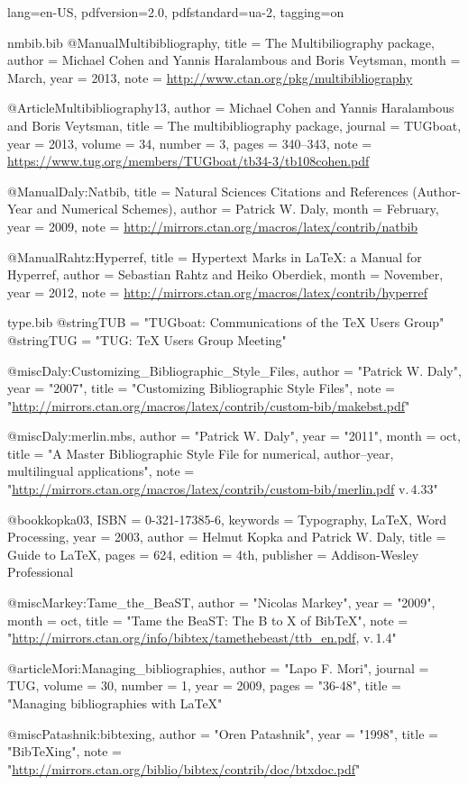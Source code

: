 \DocumentMetadata
  {
    lang=en-US,
    pdfversion=2.0,
    pdfstandard=ua-2,
    tagging=on
  }
\begin{filecontents}[noheader]{nmbib.bib}
@Manual{Multibibliography,
  title = 	 {The {M}ultibiliography package},
  author =	 {Michael Cohen and Yannis Haralambous and Boris Veytsman},
  month =	 {March},
  year =	 2013,
  note =	 {\url{http://www.ctan.org/pkg/multibibliography}}
}

@Article{Multibibliography13,
  author = 	 {Michael Cohen and Yannis Haralambous and Boris Veytsman},
  title = 	 {The multibibliography package},
  journal = 	 {TUGboat},
  year = 	 2013,
  volume =	 34,
  number =	 3,
  pages =	 {340--343},
  note =	 {\url{https://www.tug.org/members/TUGboat/tb34-3/tb108cohen.pdf}}
}

@Manual{Daly:Natbib,
  title = 	 {Natural Sciences Citations and References
                  (Author-Year and Numerical Schemes)},
  author =	 {Patrick W. Daly},
  month =	 {February},
  year =	 2009,
  note =	 {\url{http://mirrors.ctan.org/macros/latex/contrib/natbib}}
}

@Manual{Rahtz:Hyperref,
  title = 	 {Hypertext Marks in \LaTeX: a Manual for Hyperref},
  author =	 {Sebastian Rahtz and Heiko Oberdiek},
  month =	 {November},
  year =	 2012,
  note =	 {\url{http://mirrors.ctan.org/macros/latex/contrib/hyperref}}
}
\end{filecontents}
\begin{filecontents}[noheader]{type.bib}
@string{TUB = "TUGboat: Communications of the {\TeX} Users Group"}
@string{TUG = "TUG: {\TeX} Users Group Meeting"}

@misc{Daly:Customizing_Bibliographic_Style_Files,
	author = "Patrick W. Daly",
	year = "2007",
	title = "Customizing Bibliographic Style Files",
	note = "\url{http://mirrors.ctan.org/macros/latex/contrib/custom-bib/makebst.pdf}"
}

@misc{Daly:merlin.mbs,
	author = "Patrick W. Daly",
	year = "2011",
	month = oct,
	title = "{A Master Bibliographic Style File for numerical, author--year, multilingual applications}",
	note = "\url{http://mirrors.ctan.org/macros/latex/contrib/custom-bib/merlin.pdf} v.\,4.33"
}

@book{kopka03,
	ISBN = {0-321-17385-6},
	keywords = {Typography, LaTeX, Word Processing},
	year = {2003},
	author = {Helmut Kopka and Patrick W. Daly},
	title = {Guide to LaTeX},
	pages = {624},
	edition = {4th},
	publisher = {Addison-Wesley Professional}
}

@misc{Markey:Tame_the_BeaST,
	author = "Nicolas Markey",
	year = "2009",
	month = oct,
	title = "{Tame the BeaST: The B to X of Bib{\TeX}}",
	note = "\url{http://mirrors.ctan.org/info/bibtex/tamethebeast/ttb_en.pdf}, v.\,1.4"
}

@article{Mori:Managing_bibliographies,
	author = "Lapo F. Mori",
	journal = TUG,
	volume = 30,
	number = 1,
	year = 2009,
	pages = "36-48",
	title = "Managing bibliographies with {\LaTeX}"
}

@misc{Patashnik:bibtexing,
	author = "Oren Patashnik",
	year = "1998",
	title = "Bib{\TeX}ing",
	note = "\url{http://mirrors.ctan.org/biblio/bibtex/contrib/doc/btxdoc.pdf}"
}
\end{filecontents}

